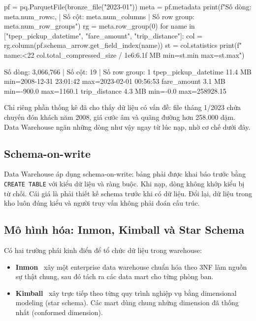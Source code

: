 \documentclass[12pt]{article}
\begin{document}
\begin{aivncodebox}
\begin{python}
pf = pq.ParquetFile(bronze_file("2023-01"))
meta = pf.metadata
print(f"Số dòng: {meta.num_rows:,} | Số cột: {meta.num_columns} | Số row group: {meta.num_row_groups}")
rg = meta.row_group(0)
for name in ["tpep_pickup_datetime", "fare_amount", "trip_distance"]:
    col = rg.column(pf.schema_arrow.get_field_index(name))
    st = col.statistics
    print(f"  {name:<22} {col.total_compressed_size / 1e6:6.1f} MB  min={st.min}  max={st.max}")
\end{python}
\end{aivncodebox}

\begin{aivnCodeOutput}[Output]
\begin{python}
Số dòng: 3,066,766 | Số cột: 19 | Số row group: 1
  tpep_pickup_datetime     11.4 MB  min=2008-12-31 23:01:42  max=2023-02-01 00:56:53
  fare_amount               3.1 MB  min=-900.0  max=1160.1
  trip_distance             4.3 MB  min=-0.0  max=258928.15
\end{python}
\end{aivnCodeOutput}

Chỉ riêng phần thống kê đã cho thấy dữ liệu có vấn đề: file tháng 1/2023 chứa chuyến đón khách năm 2008, giá cước âm và quãng đường hơn 258.000 dặm. Data Warehouse ngăn những dòng như vậy ngay từ lúc nạp, nhờ cơ chế dưới đây.

\subsection{Schema-on-write}

Data Warehouse áp dụng schema-on-write: bảng phải được khai báo trước bằng \texttt{CREATE TABLE} với kiểu dữ liệu và ràng buộc. Khi nạp, dòng không khớp kiểu bị từ chối. Cái giá là phải thiết kế schema trước khi có dữ liệu. Đổi lại, dữ liệu trong kho luôn đúng kiểu và người truy vấn không phải đoán cấu trúc.

\subsection{Mô hình hóa: Inmon, Kimball và Star Schema}

Có hai trường phái kinh điển để tổ chức dữ liệu trong warehouse:

\begin{itemize}
    \item \textbf{Inmon}~\cite{inmon2005building} xây một enterprise data warehouse chuẩn hóa theo 3NF làm nguồn sự thật chung, sau đó tách ra các data mart cho từng phòng ban.
    \item \textbf{Kimball}~\cite{kimball2013toolkit} xây trực tiếp theo từng quy trình nghiệp vụ bằng dimensional modeling (star schema). Các mart dùng chung những dimension đã thống nhất (conformed dimension).
\end{itemize}
\end{document}
